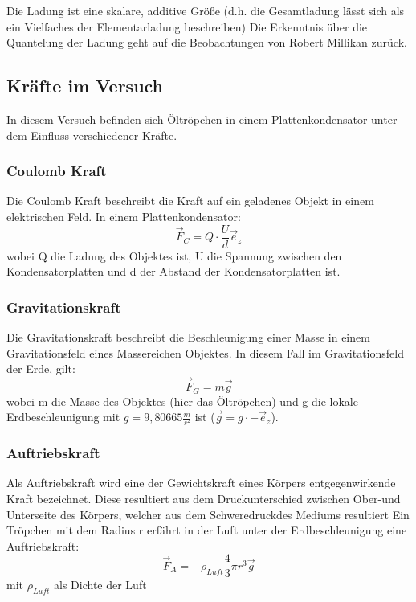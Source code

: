 \documentclass{scrartcl}
\begin{document}
		Die Ladung ist eine skalare, additive Größe (d.h. die Gesamtladung lässt sich als ein Vielfaches der Elementarladung beschreiben)
		Die Erkenntnis über die Quantelung der Ladung geht auf die Beobachtungen von Robert Millikan zurück.

	\subsection{Kräfte im Versuch}
		In diesem Versuch befinden sich Öltröpchen in einem Plattenkondensator unter dem Einfluss verschiedener Kräfte.
		\subsubsection{Coulomb Kraft}
			Die Coulomb Kraft beschreibt die Kraft auf ein geladenes Objekt in einem elektrischen Feld.
			In einem Plattenkondensator:
			\begin{equation}
				\vec{F}_C = Q \cdot \frac{U}{d} \vec{e}_z
			\end{equation}
			wobei Q die Ladung des Objektes ist, U die Spannung zwischen den Kondensatorplatten und d der Abstand der Kondensatorplatten ist.	
		\subsubsection{Gravitationskraft}
			Die Gravitationskraft beschreibt die Beschleunigung einer Masse in einem Gravitationsfeld eines Massereichen Objektes.
			In diesem Fall im Gravitationsfeld der Erde, gilt:
			\begin{equation}
				\vec{F}_G = m\vec{g}
			\end{equation}
			wobei m die Masse des Objektes (hier das Öltröpchen) und g die lokale Erdbeschleunigung mit $g = 9,80665 \frac{m}{s^2}$ ist ($\vec{g} = g \cdot -\vec{e}_z$).
		\subsubsection{Auftriebskraft}
			Als Auftriebskraft wird eine der Gewichtskraft eines Körpers entgegenwirkende Kraft bezeichnet. Diese resultiert aus dem Druckunterschied zwischen Ober-und Unterseite des Körpers, welcher aus dem Schweredruckdes Mediums resultiert
			Ein Tröpchen mit dem Radius r erfährt in der Luft unter der Erdbeschleunigung eine Auftriebskraft:
			\begin{equation}
				\vec{F}_A = - \rho_{Luft} \frac{4}{3} \pi r^3 \vec{g}
			\end{equation}
			mit $\rho_{Luft}$ als Dichte der Luft
\end{document}
